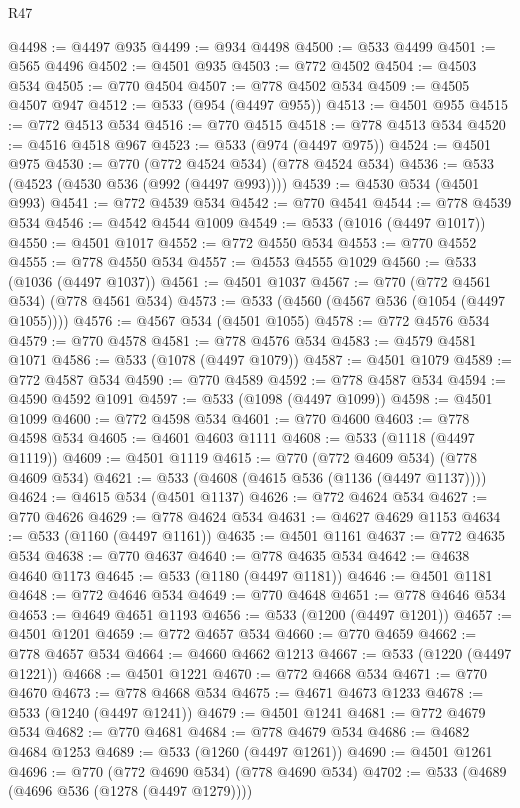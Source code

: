 \begin{lexlean}{R47}
\begin{coremodule}
@4498 := @4497 @935
@4499 := @934 @4498
@4500 := @533 @4499
@4501 := @565 @4496
@4502 := @4501 @935
@4503 := @772 @4502
@4504 := @4503 @534
@4505 := @770 @4504
@4507 := @778 @4502 @534
@4509 := @4505 @4507 @947
@4512 := @533 (@954 (@4497 @955))
@4513 := @4501 @955
@4515 := @772 @4513 @534
@4516 := @770 @4515
@4518 := @778 @4513 @534
@4520 := @4516 @4518 @967
@4523 := @533 (@974 (@4497 @975))
@4524 := @4501 @975
@4530 := @770 (@772 @4524 @534) (@778 @4524 @534)
@4536 := @533 (@4523 (@4530 @536 (@992 (@4497 @993))))
@4539 := @4530 @534 (@4501 @993)
@4541 := @772 @4539 @534
@4542 := @770 @4541
@4544 := @778 @4539 @534
@4546 := @4542 @4544 @1009
@4549 := @533 (@1016 (@4497 @1017))
@4550 := @4501 @1017
@4552 := @772 @4550 @534
@4553 := @770 @4552
@4555 := @778 @4550 @534
@4557 := @4553 @4555 @1029
@4560 := @533 (@1036 (@4497 @1037))
@4561 := @4501 @1037
@4567 := @770 (@772 @4561 @534) (@778 @4561 @534)
@4573 := @533 (@4560 (@4567 @536 (@1054 (@4497 @1055))))
@4576 := @4567 @534 (@4501 @1055)
@4578 := @772 @4576 @534
@4579 := @770 @4578
@4581 := @778 @4576 @534
@4583 := @4579 @4581 @1071
@4586 := @533 (@1078 (@4497 @1079))
@4587 := @4501 @1079
@4589 := @772 @4587 @534
@4590 := @770 @4589
@4592 := @778 @4587 @534
@4594 := @4590 @4592 @1091
@4597 := @533 (@1098 (@4497 @1099))
@4598 := @4501 @1099
@4600 := @772 @4598 @534
@4601 := @770 @4600
@4603 := @778 @4598 @534
@4605 := @4601 @4603 @1111
@4608 := @533 (@1118 (@4497 @1119))
@4609 := @4501 @1119
@4615 := @770 (@772 @4609 @534) (@778 @4609 @534)
@4621 := @533 (@4608 (@4615 @536 (@1136 (@4497 @1137))))
@4624 := @4615 @534 (@4501 @1137)
@4626 := @772 @4624 @534
@4627 := @770 @4626
@4629 := @778 @4624 @534
@4631 := @4627 @4629 @1153
@4634 := @533 (@1160 (@4497 @1161))
@4635 := @4501 @1161
@4637 := @772 @4635 @534
@4638 := @770 @4637
@4640 := @778 @4635 @534
@4642 := @4638 @4640 @1173
@4645 := @533 (@1180 (@4497 @1181))
@4646 := @4501 @1181
@4648 := @772 @4646 @534
@4649 := @770 @4648
@4651 := @778 @4646 @534
@4653 := @4649 @4651 @1193
@4656 := @533 (@1200 (@4497 @1201))
@4657 := @4501 @1201
@4659 := @772 @4657 @534
@4660 := @770 @4659
@4662 := @778 @4657 @534
@4664 := @4660 @4662 @1213
@4667 := @533 (@1220 (@4497 @1221))
@4668 := @4501 @1221
@4670 := @772 @4668 @534
@4671 := @770 @4670
@4673 := @778 @4668 @534
@4675 := @4671 @4673 @1233
@4678 := @533 (@1240 (@4497 @1241))
@4679 := @4501 @1241
@4681 := @772 @4679 @534
@4682 := @770 @4681
@4684 := @778 @4679 @534
@4686 := @4682 @4684 @1253
@4689 := @533 (@1260 (@4497 @1261))
@4690 := @4501 @1261
@4696 := @770 (@772 @4690 @534) (@778 @4690 @534)
@4702 := @533 (@4689 (@4696 @536 (@1278 (@4497 @1279))))

\end{coremodule}
\end{lexlean}

